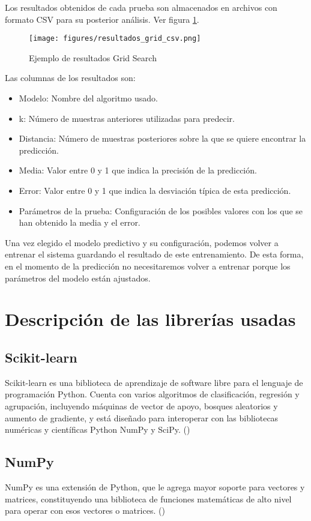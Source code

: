 	Los resultados obtenidos de cada prueba son almacenados en archivos con formato CSV para su posterior análisis. Ver figura \ref{csv}.	

	\begin{figure}[htb]
		\begin{center}
			\texttt{[image: figures/resultados\_grid\_csv.png]}
			\caption{Ejemplo de resultados Grid Search \label{csv}}
		\end{center}
	\end{figure}

	Las columnas de los resultados son:
	\begin{itemize}
		\item Modelo: Nombre del algoritmo usado.
		\item k: Número de muestras anteriores utilizadas para predecir.
		\item Distancia: Número de muestras posteriores sobre la que se quiere encontrar la predicción.
		\item Media: Valor entre 0 y 1 que indica la precisión de la predicción.
		\item Error: Valor entre 0 y 1 que indica la desviación típica de esta predicción.
		\item Parámetros de la prueba: Configuración de los posibles valores con los que se han obtenido la media y el error.
	\end{itemize}

	Una vez elegido el modelo predictivo y su configuración, podemos volver a entrenar el sistema guardando el resultado de este entrenamiento. De esta forma, en el momento de la predicción no necesitaremos volver a entrenar porque los parámetros del modelo están ajustados.

\section{Descripción de las librerías usadas}
\label{makereference5.5}
	\subsection{Scikit-learn}
	\label{makereference5.5.1}
	Scikit-learn es una biblioteca de aprendizaje de software libre para el lenguaje de programación Python. Cuenta con varios algoritmos de clasificación, regresión y agrupación, incluyendo máquinas de vector de apoyo, bosques aleatorios y aumento de gradiente, y está diseñado para interoperar con las bibliotecas numéricas y científicas Python NumPy y SciPy. (\cite{ARP:Scikit:2017})
	
	\subsection{NumPy}
	\label{makereference5.5.2}
	NumPy es una extensión de Python, que le agrega mayor soporte para vectores y matrices, constituyendo una biblioteca de funciones matemáticas de alto nivel para operar con esos vectores o matrices. (\cite{ARP:Numpy:2017})
